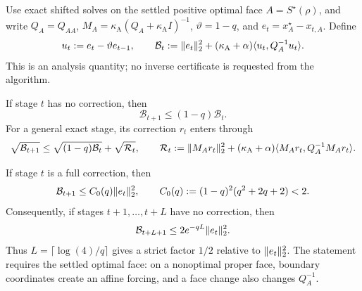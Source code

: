 \begin{proposition}
\label{prop:aesp-cd-cross-normalized-bank}
Use exact shifted solves on the settled positive optimal face
$A=S^\star(\rho)$, and write $Q_A=Q_{AA}$,
$M_A=\kappa_{\mathrm A}(Q_A+\kappa_{\mathrm A}I)^{-1}$,
$\vartheta=1-q$, and $e_t=x_A^\star-x_{t,A}$.  Define
\begin{equation}
 u_t:=e_t-\vartheta e_{t-1},\qquad
 \mathcal B_t:=\lVert e_t\rVert_2^2
  +(\kappa_{\mathrm A}+\alpha)
    \langle u_t,Q_A^{-1}u_t\rangle.
 \label{eq:aesp-cd-cross-normalized-bank}
\end{equation}
This is an analysis quantity; no inverse certificate is requested from the
algorithm.

If stage $t$ has no correction, then
\begin{equation}
 \mathcal B_{t+1}\leq(1-q)\mathcal B_t.
 \label{eq:aesp-cd-cross-normalized-contraction}
\end{equation}
For a general exact stage, its correction $r_t$ enters through
\begin{equation}
 \sqrt{\mathcal B_{t+1}}
 \leq\sqrt{(1-q)\mathcal B_t}+\sqrt{\mathcal R_t},
 \qquad
 \mathcal R_t:=\lVert M_Ar_t\rVert_2^2
 +(\kappa_{\mathrm A}+\alpha)
   \langle M_Ar_t,Q_A^{-1}M_Ar_t\rangle.
 \label{eq:aesp-cd-cross-normalized-forcing}
\end{equation}

If stage $t$ is a full correction, then
\begin{equation}
 \mathcal B_{t+1}
 \leq C_0(q)\lVert e_t\rVert_2^2,\qquad
 C_0(q):=(1-q)^2(q^2+2q+2)<2.
 \label{eq:aesp-cd-cross-normalized-full-reset}
\end{equation}
Consequently, if stages $t+1,\ldots,t+L$ have no correction, then
\begin{equation}
 \mathcal B_{t+L+1}
 \leq2e^{-qL}\lVert e_t\rVert_2^2.
 \label{eq:aesp-cd-cross-normalized-window}
\end{equation}
Thus $L=\lceil\log(4)/q\rceil$ gives a strict factor $1/2$ relative to
$\lVert e_t\rVert_2^2$.  The statement requires the settled optimal face: on a
nonoptimal proper face, boundary coordinates create an affine forcing, and a
face change also changes $Q_A^{-1}$.
\end{proposition}

